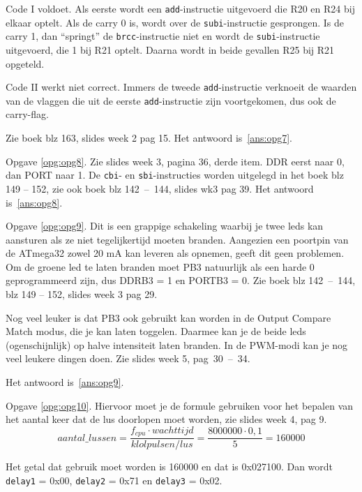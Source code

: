 \documentclass[a4paper,12pt,fleqn,dutch,mimicwordtwentyten]{tisdexam}
\begin{document}
\begin{questions}
Code I voldoet. Als eerste wordt een \texttt{add}-instructie uitgevoerd die R20
en R24 bij elkaar optelt. Als de carry 0 is, wordt over de
\texttt{subi}-instructie gesprongen. Is de carry 1, dan ``springt'' de
\texttt{brcc}-instructie niet en wordt de \texttt{subi}-instructie uitgevoerd,
die 1 bij R21 optelt. Daarna wordt in beide gevallen R25 bij R21 opgeteld.

Code II werkt niet correct. Immers de tweede \texttt{add}-instructie verknoeit
de waarden van de vlaggen die uit de eerste \texttt{add}-instructie zijn
voortgekomen, dus ook de carry-flag.

Zie boek blz 163, slides week 2 pag 15. Het antwoord is~\ref{ans:opg7}.

\vspace{1em}
Opgave \ref{opg:opg8}.\label{sol:opg8}
Zie slides week 3, pagina 36, derde item. DDR eerst naar 0, dan PORT naar 1.
De \texttt{cbi}- en \texttt{sbi}-instructies worden uitgelegd in het boek
blz 149 -- 152, zie ook boek blz 142~--~144, slides wk3 pag 39.
Het antwoord is~\ref{ans:opg8}.

\vspace{1em}
Opgave \ref{opg:opg9}.\label{sol:opg9}
Dit is een grappige schakeling waarbij je twee leds kan aansturen als ze niet
tegelijkertijd moeten branden. Aangezien een poortpin van de ATmega32 zowel
20 mA kan leveren als opnemen, geeft dit geen problemen. Om de groene
led te laten branden moet PB3 natuurlijk als een harde 0 geprogrammeerd zijn,
dus DDRB3 = 1 en PORTB3 = 0. Zie boek blz 142~--~144, blz 149 -- 152, slides
week 3 pag 29.

Nog veel leuker is dat PB3 ook gebruikt kan worden in de Output Compare Match
modus, die je kan laten toggelen. Daarmee kan je de beide leds (ogenschijnlijk)
op halve intensiteit laten branden. In de PWM-modi kan je nog veel leukere
dingen doen. Zie slides week 5, pag~30~--~34.

Het antwoord is~\ref{ans:opg9}.

\vspace{1em}
Opgave \ref{opg:opg10}.\label{sol:opg10}
Hiervoor moet je de formule gebruiken voor het bepalen van het
aantal keer dat de lus doorlopen moet worden, zie slides week 4, pag 9.
\begin{equation*}
aantal\_lussen = \dfrac{f_{cpu} \cdot wachttijd}{klolpulsen/lus}=
                 \dfrac{8000000 \cdot 0,1}{5} = 160000
\end{equation*} 

Het getal dat gebruik moet worden is 160000 en dat is 0x027100. Dan wordt
\texttt{delay1} = 0x00, \texttt{delay2} = 0x71 en \texttt{delay3} = 0x02.


\end{questions}
\end{document}
